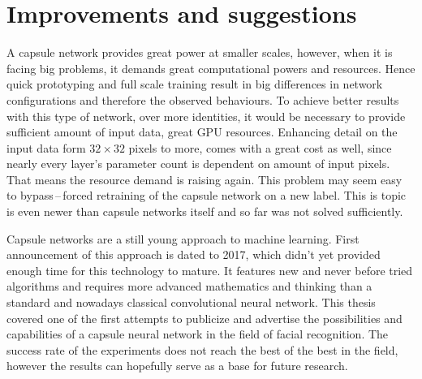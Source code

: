 \section{Improvements and suggestions}

A capsule network provides great power at smaller scales, however, when it is facing big problems, it demands great computational powers and resources. Hence quick prototyping and full scale training result in big differences in network configurations and therefore the observed behaviours. To achieve better results with this type of network, over more identities, it would be necessary to provide sufficient amount of input data, great GPU resources. Enhancing detail on the input data form $32\times32$ pixels to more, comes with a great cost as well, since nearly every layer's parameter count is dependent on amount of input pixels. That means the resource demand is raising again. This problem may seem easy to bypass\,--\,forced retraining of the capsule network on a new label. This is topic is even newer than capsule networks itself and so far was not solved sufficiently.

Capsule networks are a still young approach to machine learning. First announcement of this approach is dated to 2017, which didn't yet provided enough time for this technology to mature. It features new and never before tried algorithms and requires more advanced mathematics and thinking than a standard and nowadays classical convolutional neural network. This thesis covered one of the first attempts to publicize and advertise the possibilities and capabilities of a capsule neural network in the field of facial recognition. The success rate of the experiments does not reach the best of the best in the field, however the results can hopefully serve as a base for future research.
